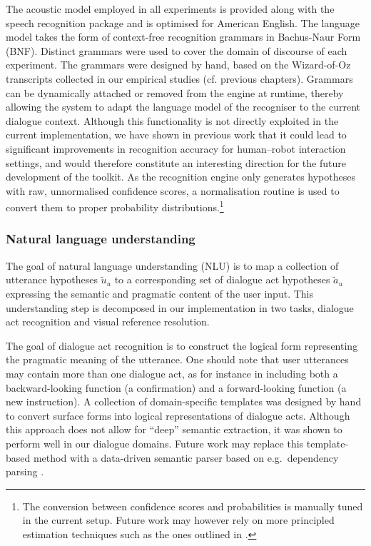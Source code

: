 The acoustic model employed in all experiments is provided along with the speech recognition package and is optimised for American English. The language model takes the form of context-free recognition grammars in Bachus-Naur Form (BNF). Distinct grammars were used to cover the domain of discourse of each experiment. The grammars were designed by hand, based on the Wizard-of-Oz transcripts collected in our empirical studies (cf. previous chapters). Grammars can be dynamically attached or removed from the engine at runtime, thereby allowing the system to adapt the language model of the recogniser to the current dialogue context. Although this functionality is not directly exploited in the current implementation, we have shown in previous work \citep[see ][]{ESSLLI2008-springerreprint} that it could lead to significant improvements in recognition accuracy for human--robot interaction settings, and would therefore constitute an interesting direction for the future development of the toolkit.  As the recognition engine only generates hypotheses with raw, unnormalised confidence scores, a normalisation routine is used to convert them to proper probability distributions.\footnote{The conversion between confidence scores and probabilities is manually tuned in the current setup.  Future work may however rely on more principled estimation techniques such as the ones outlined in \cite{Williams08}.}


\subsubsection*{Natural language understanding}

The goal of natural language understanding (NLU) is to map a collection of utterance hypotheses $\tilde{u}_u$ to a corresponding set of dialogue act hypotheses $\tilde{a}_u$ expressing the semantic and pragmatic content of the user input. This understanding step is decomposed in our implementation in two tasks, dialogue act recognition and visual reference resolution.  

The goal of dialogue act recognition is to construct the logical form representing the pragmatic meaning of the utterance. One should note that user utterances may contain more than one dialogue act, as for instance in  including both a backward-looking function (a confirmation) and a forward-looking function (a new instruction).  A collection of domain-specific templates was designed by hand to convert surface forms into logical representations of dialogue acts.  Although this approach does not allow for ``deep'' semantic extraction, it was shown to perform well in our dialogue domains. Future work may replace this template-based method with a data-driven semantic parser based on e.g.\  dependency parsing \citep{Nivre:Etal07}.  


